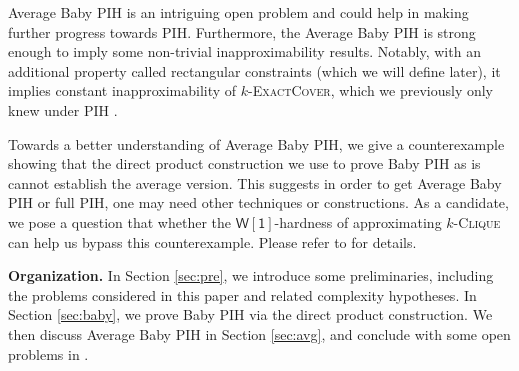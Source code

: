 \documentclass[10pt,a4paper]{article}
\newcommand{\wone}{\mathsf{W[1]}}
\newcommand{\kclique}{\textsc{$k$-Clique}}
\newcommand{\kexact}{\textsc{$k$-ExactCover}}
\begin{document}
Average Baby PIH is an intriguing open problem and could help in making further progress towards PIH. Furthermore, the Average Baby PIH is strong enough to imply some non-trivial inapproximability results. 
Notably, with an additional property called rectangular constraints (which we will define later), it implies constant inapproximability of \kexact{}, which we previously only knew under PIH \cite{Man20}. 

Towards a better understanding of Average Baby PIH, we give a counterexample showing that the direct product construction we use to prove Baby PIH as is cannot establish the average version. This suggests in order to get Average Baby PIH or full PIH, one may need other techniques or constructions. As a candidate, we pose a question that whether the $\wone$-hardness of approximating \kclique{} can help us bypass this counterexample. Please refer to  for details. 

\medskip \noindent \textbf{Organization.}
In Section \ref{sec:pre}, we introduce some preliminaries, including the problems considered in this paper and related complexity hypotheses. In Section \ref{sec:baby}, we prove Baby PIH via the direct product construction. We then discuss Average Baby PIH in Section \ref{sec:avg}, and conclude with some open problems in .

\end{document}
